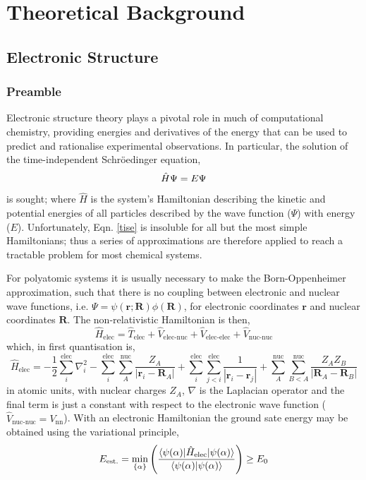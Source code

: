 \documentclass[main.tex]{subfiles}
\begin{document}
\setcounter{footnote}{0} 

\chapter{Theoretical Background}

\section{Electronic Structure}
\subsection{Preamble}
Electronic structure theory plays a pivotal role in much of computational chemistry, providing energies and derivatives of the energy that can be used to predict and rationalise experimental observations. In particular, the solution of the time-independent Schr\"{o}edinger equation,
\begin{equation}
\hat{H} \Psi  = E \Psi
\label{tise}
\vspace{-0.3cm}
\end{equation}
is sought; where $\hat{H}$ is the system's Hamiltonian describing the kinetic and potential energies of all particles described by the wave function ($\Psi$) with  energy ($E$). Unfortunately, Eqn. \eqref{tise} is insoluble for all but the most simple Hamiltonians; thus a series of approximations are therefore applied to reach a tractable problem for most chemical systems.

For polyatomic systems it is usually necessary to make the Born-Oppenheimer approximation, such that there is no coupling between electronic and nuclear wave functions, i.e. $\Psi = \psi(\boldsymbol{r}; \boldsymbol{R})\phi(\boldsymbol{R})$, for electronic coordinates $\boldsymbol{r}$ and nuclear coordinates $\boldsymbol{R}$. The non-relativistic Hamiltonian is then,
\begin{equation}
\hat{H}_\text{elec} = \hat{T}_\text{elec} + \hat{V}_\text{elec-nuc} + \hat{V}_\text{elec-elec} +  \hat{V}_\text{nuc-nuc}
\end{equation}
which, in first quantisation is,
\begin{equation}
\hat{H}_\text{elec} = -\frac{1}{2}\sum_{i}^\text{elec} \nabla^2_i  - \sum_{i}^\text{elec}\sum_A^\text{nuc}\frac{Z_A}{|\boldsymbol{r}_i - \boldsymbol{R}_A|} +  \sum_{i}^\text{elec}\sum_{j < i}^\text{elec} \frac{1}{|\boldsymbol{r}_i - \boldsymbol{r}_j|} + \sum_{A}^\text{nuc}\sum_{B < A}^\text{nuc} \frac{Z_A Z_B}{|\boldsymbol{R}_A - \boldsymbol{R}_B|}
\label{H_elec}
\end{equation}
 in atomic units, with nuclear charges $Z_A$, $\nabla$ is the Laplacian operator and the final term is just a constant with respect to the electronic wave function ($\hat{V}_\text{nuc-nuc} = V_\text{nn}$). With an electronic Hamiltonian the ground sate energy may be obtained using the variational principle,
 \begin{equation}
 	E_\text{est.} = \min_{\{\alpha\}}\left(\frac{\braket{\psi(\alpha) | \hat{H}_\text{elec}| \psi(\alpha)}}{\braket{\psi(\alpha)| \psi(\alpha)}}\right) \ge E_0
 \end{equation}
 
\end{document}
